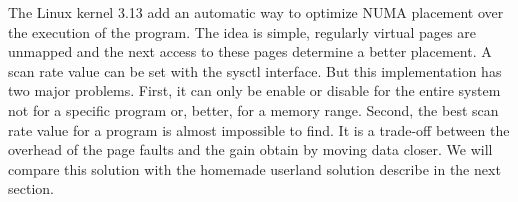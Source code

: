 The Linux kernel 3.13 add an automatic way to optimize NUMA placement over the execution of the program.
%
The idea is simple, regularly virtual pages are unmapped and the next access to these pages determine a better placement.
%
A scan rate value can be set with the sysctl interface.
%
But this implementation has two major problems.
%
First, it can only be enable or disable for the entire system not for a specific program or, better, for a memory range.
%
Second, the best scan rate value for a program is almost impossible to find.
%
It is a trade-off between the overhead of the page faults and the gain obtain by moving data closer.
%
We will compare this solution with the homemade userland solution describe in the next section.
